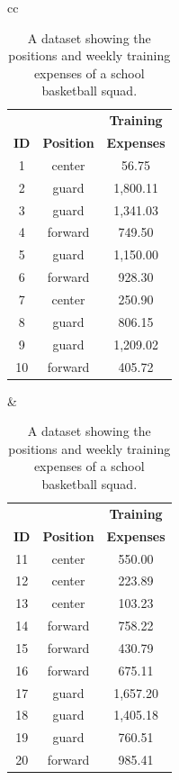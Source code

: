 \documentclass[xcolor={table}]{beamer}
\begin{document}
 \begin{frame} 
\begin{table}[htb]
\caption{A dataset showing the positions and weekly training expenses of a school basketball squad.}
\label{table:positionsAndExpenses}
\centering
\begin{footnotesize}
\begin{tabular}{cc}
		\hline
			\begin{minipage}{0.4\textwidth}
					\begin{tabular}[ht]{ c c c }
\textbf{}	 & \textbf{}	 & \textbf{Training}\\
\textbf{ID}	 & \textbf{Position}	 & \textbf{Expenses}\\
\hline
1	&	center	&	56.75	\\
2	&	guard	&	1,800.11	\\
3	&	guard	&	1,341.03	\\
4	&	forward	&	749.50	\\
5	&	guard	&	1,150.00	\\
6	&	forward	&	928.30	\\
7	&	center	&	250.90	\\
8	&	guard	&	806.15	\\
9	&	guard	&	1,209.02	\\
10	&	forward	&	405.72	\\
\hline
					\end{tabular}
			\end{minipage}
			&
			\begin{minipage}{0.4\textwidth}
					\begin{tabular}[ht]{ccc} 
\textbf{}	 & \textbf{}	 & \textbf{Training}\\
\textbf{ID}	 & \textbf{Position}	 & \textbf{Expenses}\\
\hline
11	&	center	&	550.00	\\
12	&	center	&	223.89	\\
13	&	center	&	103.23	\\
14	&	forward	&	758.22	\\
15	&	forward	&	430.79	\\
16	&	forward	&	675.11	\\
17	&	guard	&	1,657.20	\\
18	&	guard	&	1,405.18	\\
19	&	guard	&	760.51	\\
20	&	forward	&	985.41	\\
\hline
				\end{tabular}
			\end{minipage}\\
\end{tabular}
\end{footnotesize}

\end{table}
\end{frame} 
\end{document}
